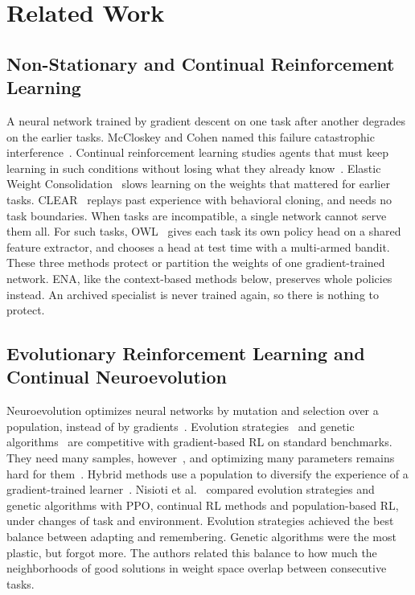 \section{Related Work}
\label{sec:related}

\subsection{Non-Stationary and Continual Reinforcement Learning}
A neural network trained by gradient descent on one task after another degrades on the earlier tasks. McCloskey and Cohen named this failure catastrophic interference~\cite{mccloskey1989catastrophic}. Continual reinforcement learning studies agents that must keep learning in such conditions without losing what they already know~\cite{khetarpal2022towards}. Elastic Weight Consolidation~\cite{kirkpatrick2017overcoming} slows learning on the weights that mattered for earlier tasks. CLEAR~\cite{rolnick2019experience} replays past experience with behavioral cloning, and needs no task boundaries. When tasks are incompatible, a single network cannot serve them all. For such tasks, OWL~\cite{kessler2022same} gives each task its own policy head on a shared feature extractor, and chooses a head at test time with a multi-armed bandit. These three methods protect or partition the weights of one gradient-trained network. ENA, like the context-based methods below, preserves whole policies instead. An archived specialist is never trained again, so there is nothing to protect.

\subsection{Evolutionary Reinforcement Learning and Continual Neuroevolution}
Neuroevolution optimizes neural networks by mutation and selection over a population, instead of by gradients~\cite{stanley2019designing}. Evolution strategies~\cite{salimans2017evolution} and genetic algorithms~\cite{such2017deep} are competitive with gradient-based RL on standard benchmarks. They need many samples, however~\cite{khadka2018evolutionary,pourchot2019cemrl}, and optimizing many parameters remains hard for them~\cite{khadka2018evolutionary}. Hybrid methods use a population to diversify the experience of a gradient-trained learner~\cite{khadka2018evolutionary}. Nisioti et al.~\cite{nisioti2026continual} compared evolution strategies and genetic algorithms with PPO, continual RL methods and population-based RL, under changes of task and environment. Evolution strategies achieved the best balance between adapting and remembering. Genetic algorithms were the most plastic, but forgot more. The authors related this balance to how much the neighborhoods of good solutions in weight space overlap between consecutive tasks.

